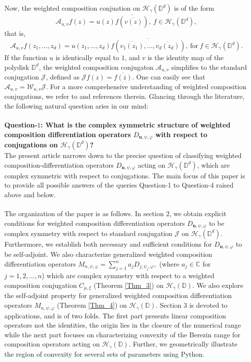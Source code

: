 \documentclass[12pt, reqno]{amsart}
\theoremstyle{definition}
\theoremstyle{remark}
\numberwithin{equation}{section}
\newcommand{\mfn}{\mathbf n}
\begin{document}
Now, the weighted composition conjuation on $\mathcal{H}_\gamma(\mathbb{D}^d)$ is of the form 
$$\mathcal{A}_{u, v}f(z)=u(z)\overline{f(\overline{v(z)})},~f\in \mathcal{H}_\gamma(\mathbb{D}^d),$$
that is, 
$$\mathcal{A}_{u, v} f(z_1,\dots, z_d)=u(z_1,\dots, z_d)\overline{f(\overline{v_1(z_1)}, \dots, \overline{v_d(z_d)})},~\mbox{for}~f\in \mathcal{H}_\gamma(\mathbb{D}^d).$$
If the function $u$ is identically equal to $1$, and $v$ is the identity map of the polydisk $\mathbb{D}^d$, the weighted composition conjugaton $\mathcal{A}_{u, v}$ simplifies to the standard conjugation $\mathcal{J}$, defined as $\mathcal{J}f(z)=\overline{f(\overline{z})}$. One can easily see that $\mathcal{A}_{u, v}=\mathcal{W}_{u, v}\mathcal{J}$. For a more comprehensive understanding of weighted composition conjugations, we refer to \cite{Lim_Khoi_JMAA_2018} and references therein. Glancing through the literature, the following natural question aries in our mind:\\ \\
{\bf Question-$1$: What is the complex symmetric structure of  weighted composition differentiation operators $D_{\mfn,\psi,\varphi}$ with respect to conjugations on $\mathcal{H}_\gamma(\mathbb{D}^d)$?}  \\


The present article narrows down to the precise question of classifying
weighted composition-differentiation operators $D_{\mfn,\psi,\varphi}$ acting on $\mathcal{H}_\gamma(\mathbb{D}^d)$, which are complex symmetric with respect to conjugations. The main focus of this paper is to provide all possible answers of the queries Question-1 to Question-4
raised above and below.\\ \\
The organization of the paper is as follows. In section 2, we obtain explicit conditions for weighted composition differentiation operators $D_{\mfn,\psi,\varphi}$ to be complex symmetry with respect to standard conjugation $\mathcal{J}$ on $\mathcal{H}_\gamma(\mathbb{D}^d)$. Furthermore, we establish both necessary and sufficient conditions for $D_{\mfn,\psi,\varphi}$ to be self-adjoint. We also characterize generalized weighted composition differentiation  operators $M_{n, \psi, \varphi}=\sum_{j=1}^{n}a_jD_{j,\psi_j, \varphi},$
(where $a_j\in \mathbb{C}$ for $j=1, 2, \dots, n$)  which are complex symmetry with respect to a weighted composition conjugation $C_{\mu, \xi}$ (Theorem \ref{Thm_3}) on  $\mathcal{H}_\gamma(\mathbb{D})$. We also explore the self-adjoint property for generalized weighted composition differentiation  operators $M_{n, \psi, \varphi}$ (Theorem \ref{Thm_4}) on $\mathcal{H}_\gamma(\mathbb{D})$. 
Section 3 is devoted to applications, and is of two folds. The first part presents linear composition operators not the  identities, the origin lies in the closure of the numerical range while the next part focuses on characterizing convexity of the Berezin range for composition operators acting on $\mathcal{H}_\gamma(\mathbb{D})$. Further, we geometrically illustrate the region of convexity for several sets of parameters using Python.
\end{document}
